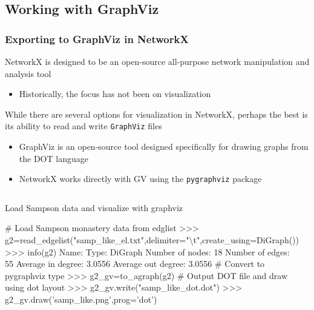 \documentclass[xcolor=dvipsnames, 9pt]{beamer}
\newenvironment{code}{\begin{semiverbatim} \begin{footnotesize}}
{\end{footnotesize}\end{semiverbatim}}
\begin{document}
\subsection{Working with GraphViz} %
\label{sub:working_with_graphviz}

\begin{frame}[fragile]
    \frametitle{Exporting to GraphViz in NetworkX}
    NetworkX is designed to be an open-source all-purpose network manipulation and analysis tool
    \begin{itemize}
        \item Historically, the focus has not been on visualization
    \end{itemize}
    While there are several options for visualization in NetworkX, perhaps the best is its ability to read and write \texttt{GraphViz} files
    \begin{itemize}
        \item GraphViz is an open-source tool designed specifically for drawing graphs from the DOT language
        \item NetworkX works directly with GV using the \texttt{pygraphviz} package
    \end{itemize}
    \begin{columns}
        \begin{block}{\scriptsize{Load Sampson data and visualize with graphviz}}
            \begin{code}
\tiny{\alert<2>{# Load Sampson monastery data from edglist}
>>> g2=read_edgelist("samp_like_el.txt",delimiter="\textbackslash t",create_using=DiGraph())
>>> info(g2)
Name:                  
Type:                  DiGraph
Number of nodes:       18
Number of edges:       55
Average in degree:     3.0556
Average out degree:    3.0556
\alert<3>{# Convert to pygraphviz type}
>>> g2_gv=to_agraph(g2)
\alert<4>{# Output DOT file and draw using dot layout}
>>> g2_gv.write("samp_like_dot.dot")
>>> g2_gv.draw('samp_like.png',prog='dot')}
            \end{code}
        \end{block}
        \begin{center}
        \end{center}
    \end{columns}
\end{frame}


\end{document}
